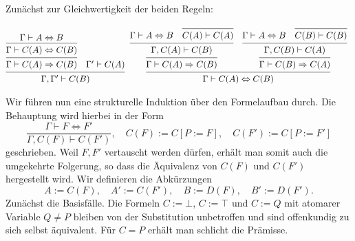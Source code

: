 \begin{Beweis}
Zunächst zur Gleichwertigkeit der beiden Regeln:
\begin{small}
\[\begin{array}{@{}l@{\;\;}l}
\begin{prooftree}[separation = 1em, center = false]
      \hypo{\Gamma\vdash A\bicond B}
    \infer1{\Gamma\vdash C(A)\bicond C(B)}
  \infer1{\Gamma\vdash C(A)\cond C(B)}
  \hypo{\Gamma'\vdash C(A)}
\infer2{\Gamma,\Gamma'\vdash C(B)}
\end{prooftree}
&
\begin{prooftree}[separation = 1em, center = false]
      \hypo{\Gamma\vdash A\bicond B}
      \infer0{C(A)\vdash C(A)}
    \infer2{\Gamma, C(A)\vdash C(B)}
  \infer1{\Gamma\vdash C(A)\cond C(B)}
      \hypo{\Gamma\vdash A\bicond B}
      \infer0{C(B)\vdash C(B)}
    \infer2{\Gamma, C(B)\vdash C(A)}
  \infer1{\Gamma\vdash C(B)\cond C(A)}
\infer2{\Gamma\vdash C(A)\bicond C(B)}
\end{prooftree}
\end{array}\]
\end{small}%
Wir führen nun eine strukturelle Induktion über den Formelaufbau durch.
Die Behauptung wird hierbei in der Form
\[\dfrac{\Gamma\vdash F\Leftrightarrow F'}{
\Gamma,C(F)\vdash C(F')},\quad C(F) := C[P:=F],\quad C(F') := C[P:=F']\]
geschrieben. Weil $F,F'$ vertauscht werden dürfen, erhält man somit auch
die umgekehrte Folgerung, so dass die Äquivalenz von $C(F)$ und $C(F')$
hergestellt wird. Wir definieren die Abkürzungen
\[A := C(F),\quad A' := C(F'),\quad B := D(F),\quad B' := D(F').\]
Zunächst die Basisfälle. Die Formeln $C:=\bot$,
$C:=\top$ und $C:=Q$ mit atomarer Variable $Q\ne P$
bleiben von der Substitution unbetroffen und sind offenkundig zu sich
selbst äquivalent. Für $C=P$ erhält man schlicht die Prämisse.


\end{Beweis}
